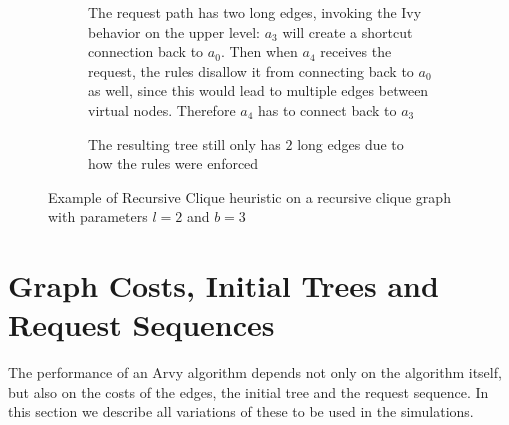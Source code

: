 \documentclass[a4paper, oneside]{discothesis}
\begin{document}
\begin{figure}[H]
\begin{subfigure}[t]{0.5\textwidth}
\begin{tikzpicture}
\end{tikzpicture}
\caption{The request path has two long edges, invoking the Ivy behavior on the upper level: $a_{3}$ will create a shortcut connection back to $a_{0}$. Then when $a_{4}$ receives the request, the rules disallow it from connecting back to $a_{0}$ as well, since this would lead to multiple edges between virtual nodes. Therefore $a_{4}$ has to connect back to $a_{3}$}
\end{subfigure}
\quad
\begin{subfigure}[t]{0.5\textwidth}
\centering
{}
\caption{The resulting tree still only has $2$ long edges due to how the rules were enforced}
\end{subfigure}
\caption{Example of Recursive Clique heuristic on a recursive clique graph with parameters $l=2$ and $b=3$}
\label{fig:reclique-alg}
\end{figure}

\chapter{Graph Costs, Initial Trees and Request Sequences}

The performance of an Arvy algorithm depends not only on the algorithm itself, but also on the costs of the edges, the initial tree and the request sequence. In this section we describe all variations of these to be used in the simulations.
\end{document}
